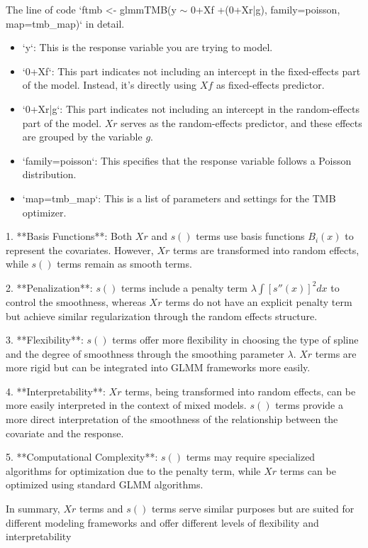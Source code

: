 The line of code `ftmb <- glmmTMB(y $\sim$ 0+Xf +(0+Xr|g), family=poisson, map=tmb_map)` in detail.

\begin{itemize}
    \item `y`: This is the response variable you are trying to model.
    \item `0+Xf`: This part indicates not including an intercept in the fixed-effects part of the model. Instead, it's directly using \(Xf\) as fixed-effects predictor.
    \item `0+Xr|g`: This part indicates not including an intercept in the random-effects part of the model. \(Xr\) serves as the random-effects predictor, and these effects are grouped by the variable \(g\).
    \item `family=poisson`: This specifies that the response variable follows a Poisson distribution.
    \item `map=tmb\_map`: This is a list of parameters and settings for the TMB optimizer.
\end{itemize}


1. **Basis Functions**: Both \(Xr\) and \(s()\) terms use basis functions \(B_i(x)\) to represent the covariates. However, \(Xr\) terms are transformed into random effects, while \(s()\) terms remain as smooth terms.

2. **Penalization**: \(s()\) terms include a penalty term \(\lambda \int [s''(x)]^2 dx\) to control the smoothness, whereas \(Xr\) terms do not have an explicit penalty term but achieve similar regularization through the random effects structure.

3. **Flexibility**: \(s()\) terms offer more flexibility in choosing the type of spline and the degree of smoothness through the smoothing parameter \(\lambda\). \(Xr\) terms are more rigid but can be integrated into GLMM frameworks more easily.

4. **Interpretability**: \(Xr\) terms, being transformed into random effects, can be more easily interpreted in the context of mixed models. \(s()\) terms provide a more direct interpretation of the smoothness of the relationship between the covariate and the response.

5. **Computational Complexity**: \(s()\) terms may require specialized algorithms for optimization due to the penalty term, while \(Xr\) terms can be optimized using standard GLMM algorithms.

In summary, \(Xr\) terms and \(s()\) terms serve similar purposes but are suited for different modeling frameworks and offer different levels of flexibility and interpretability